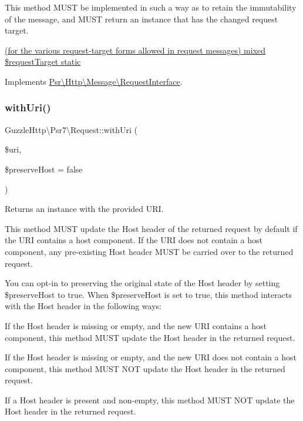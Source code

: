 This method M\+U\+ST be implemented in such a way as to retain the immutability of the message, and M\+U\+ST return an instance that has the changed request target.

\hyperlink{}{(for the various request-\/target forms allowed in request messages)  mixed \$request\+Target  static }

Implements \hyperlink{interfacePsr_1_1Http_1_1Message_1_1RequestInterface_a26d10ad91bf93238d7aa64d5469e06be}{Psr\textbackslash{}\+Http\textbackslash{}\+Message\textbackslash{}\+Request\+Interface}.

\mbox{\label{classGuzzleHttp_1_1Psr7_1_1Request_a1eb2a7b7048ec8b1e10ae535709f6917}} 
\subsubsection{\texorpdfstring{with\+Uri()}{withUri()}}
{\footnotesize\ttfamily Guzzle\+Http\textbackslash{}\+Psr7\textbackslash{}\+Request\+::with\+Uri (\begin{DoxyParamCaption}\item[{\hyperlink{interfacePsr_1_1Http_1_1Message_1_1UriInterface}{Uri\+Interface}}]{\$uri,  }\item[{}]{\$preserve\+Host = {\ttfamily false} }\end{DoxyParamCaption})}

Returns an instance with the provided U\+RI.

This method M\+U\+ST update the Host header of the returned request by default if the U\+RI contains a host component. If the U\+RI does not contain a host component, any pre-\/existing Host header M\+U\+ST be carried over to the returned request.

You can opt-\/in to preserving the original state of the Host header by setting {\ttfamily \$preserve\+Host} to {\ttfamily true}. When {\ttfamily \$preserve\+Host} is set to {\ttfamily true}, this method interacts with the Host header in the following ways\+:


\begin{DoxyItemize}
\item If the Host header is missing or empty, and the new U\+RI contains a host component, this method M\+U\+ST update the Host header in the returned request.
\item If the Host header is missing or empty, and the new U\+RI does not contain a host component, this method M\+U\+ST N\+OT update the Host header in the returned request.
\item If a Host header is present and non-\/empty, this method M\+U\+ST N\+OT update the Host header in the returned request.
\end{DoxyItemize}


